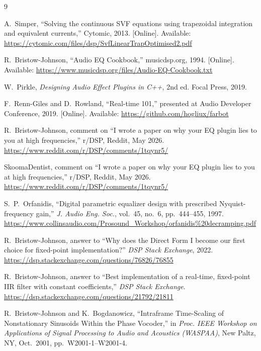 \documentclass[twoside,a4paper]{article}
\begin{document}

\begin{thebibliography}{9}

A.~Simper, ``Solving the continuous SVF equations using trapezoidal integration and equivalent currents,'' Cytomic, 2013. [Online]. Available: \url{https://cytomic.com/files/dsp/SvfLinearTrapOptimised2.pdf}

R.~Bristow-Johnson, ``Audio EQ Cookbook,'' musicdsp.org, 1994. [Online]. Available: \url{https://www.musicdsp.org/files/Audio-EQ-Cookbook.txt}

W.~Pirkle, \textit{Designing Audio Effect Plugins in C++}, 2nd ed. Focal Press, 2019.

F.~Renn-Giles and D.~Rowland, ``Real-time 101,'' presented at Audio Developer Conference, 2019. [Online]. Available: \url{https://github.com/hogliux/farbot}


R.~Bristow-Johnson, comment on ``I wrote a paper on why your EQ plugin lies to you at high frequencies,'' r/DSP, Reddit, May 2026.
\url{https://www.reddit.com/r/DSP/comments/1tqynr5/}

SkoomaDentist, comment on ``I wrote a paper on why your EQ plugin lies to you at high frequencies,'' r/DSP, Reddit, May 2026.
\url{https://www.reddit.com/r/DSP/comments/1tqynr5/}

S.~P.~Orfanidis, ``Digital parametric equalizer design with prescribed Nyquist-frequency gain,''
\textit{J. Audio Eng. Soc.}, vol.~45, no.~6, pp.~444--455, 1997.
\url{https://www.collinsaudio.com/Prosound_Workshop/orfanidis\%20decramping.pdf}

R.~Bristow-Johnson, answer to ``Why does the Direct Form I become our first choice for fixed-point implementation?''
\textit{DSP Stack Exchange}, 2022.
\url{https://dsp.stackexchange.com/questions/76826/76855}

R.~Bristow-Johnson, answer to ``Best implementation of a real-time, fixed-point IIR filter with constant coefficients,''
\textit{DSP Stack Exchange}.
\url{https://dsp.stackexchange.com/questions/21792/21811}

R.~Bristow-Johnson and K.~Bogdanowicz, ``Intraframe Time-Scaling of Nonstationary Sinusoids Within the Phase Vocoder,''
in \textit{Proc. IEEE Workshop on Applications of Signal Processing to Audio and Acoustics (WASPAA)},
New Paltz, NY, Oct.\ 2001, pp.~W2001-1--W2001-4.
\end{thebibliography}
\end{document}
